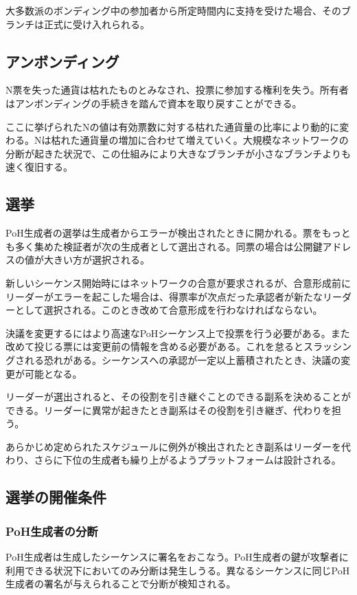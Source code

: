 \documentclass[12pt]{ltjsarticle}
\begin{document}
大多数派のボンディング中の参加者から所定時間内に支持を受けた場合、そのブランチは正式に受け入れられる。

\subsection{アンボンディング}

N票を失った通貨は枯れたものとみなされ、投票に参加する権利を失う。所有者はアンボンディングの手続きを踏んで資本を取り戻すことができる。

ここに挙げられたNの値は有効票数に対する枯れた通貨量の比率により動的に変わる。Nは枯れた通貨量の増加に合わせて増えていく。大規模なネットワークの分断が起きた状況で、この仕組みにより大きなブランチが小さなブランチよりも速く復旧する。

\subsection{選挙}\label{subsec:elections}
PoH生成者の選挙は生成者からエラーが検出されたときに開かれる。票をもっとも多く集めた検証者が次の生成者として選出される。同票の場合は公開鍵アドレスの値が大きい方が選択される。

新しいシーケンス開始時にはネットワークの合意が要求されるが、合意形成前にリーダーがエラーを起こした場合は、得票率が次点だった承認者が新たなリーダーとして選択される。このとき改めて合意形成を行わなければならない。

決議を変更するにはより高速なPoHシーケンス上で投票を行う必要がある。また改めて投じる票には変更前の情報を含める必要がある。これを怠るとスラッシングされる恐れがある。シーケンスへの承認が一定以上蓄積されたとき、決議の変更が可能となる。

リーダーが選出されると、その役割を引き継ぐことのできる副系を決めることができる。リーダーに異常が起きたとき副系はその役割を引き継ぎ、代わりを担う。

あらかじめ定められたスケジュールに例外が検出されたとき副系はリーダーを代わり、さらに下位の生成者も繰り上がるようプラットフォームは設計される。

\subsection{選挙の開催条件}
\subsubsection{PoH生成者の分断}

PoH生成者は生成したシーケンスに署名をおこなう。PoH生成者の鍵が攻撃者に利用できる状況下においてのみ分断は発生しうる。異なるシーケンスに同じPoH生成者の署名が与えられることで分断が検知される。
\end{document}
